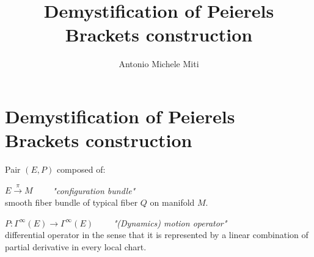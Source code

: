 \documentclass[a4paper,11pt]{scrartcl}
\title{Demystification of Peierels Brackets construction}
\author{Antonio Michele Miti}
\date{\vspace{-5ex}} %
\begin{document}

	\section*{Demystification of Peierels Brackets construction}

	\begin{definition}\label{Def:AbstracDynamicalSystem}
		Pair $(E,P )$ composed of:
		\begin{compactitemize}
			\item $E \xrightarrow{\pi} M \qquad $ \emph{"configuration bundle"}\\
			smooth fiber bundle of typical fiber $Q$ on  manifold $M$.
			\item	$ P : \Gamma^\infty(E) \rightarrow \Gamma^\infty(E) \qquad $  \emph{"(Dynamics) motion operator"}\\
			differential operator in the sense that it is represented by a linear combination of partial derivative in every local chart.
		\end{compactitemize}
	\end{definition}
\end{document}
